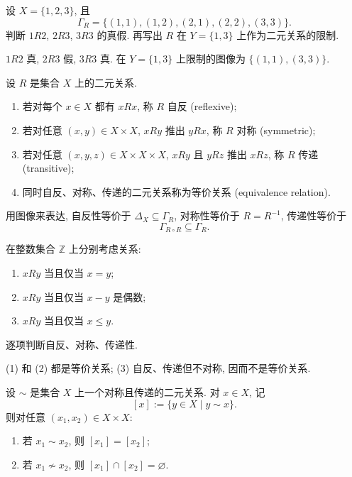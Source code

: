 \documentclass[usesamecnt, thmcnt=section, lang=cn, newtx, 10pt, scheme=chinese]{elegantbook}
\begin{document}
\begin{concept}\label{con:corr-14}
设 $X=\{1,2,3\}$, 且
\[
 \Gamma_R=\{(1,1),(1,2),(2,1),(2,2),(3,3)\}.
\]
判断 $1R2$, $2R3$, $3R3$ 的真假. 再写出 $R$ 在 $Y=\{1,3\}$ 上作为二元关系的限制.
\end{concept}

\begin{solution}
$1R2$ 真, $2R3$ 假, $3R3$ 真. 在 $Y=\{1,3\}$ 上限制的图像为 $\{(1,1),(3,3)\}$.
\end{solution}

\begin{definition}[等价关系]\label{def:corr-equivalence}
设 $R$ 是集合 $X$ 上的二元关系.
\begin{enumerate}[label=\rm(\arabic*)]
  \item 若对每个 $x\in X$ 都有 $xRx$, 称 $R$ {\color{blue}自反 (reflexive)};
  \item 若对任意 $(x,y)\in X\times X$, $xRy$ 推出 $yRx$, 称 $R$ {\color{blue}对称 (symmetric)};
  \item 若对任意 $(x,y,z)\in X\times X\times X$, $xRy$ 且 $yRz$ 推出 $xRz$, 称 $R$ {\color{blue}传递 (transitive)};
  \item 同时自反、对称、传递的二元关系称为{\color{blue}等价关系 (equivalence relation)}.
\end{enumerate}
用图像来表达, 自反性等价于 $\Delta_X\subseteq\Gamma_R$, 对称性等价于 $R=R^{-1}$, 传递性等价于
\[
 \Gamma_{R\circ R}\subseteq\Gamma_R.
\]
\end{definition}

\begin{concept}\label{con:corr-15}
在整数集合 $\mathbb Z$ 上分别考虑关系:
\begin{enumerate}[label=\rm(\arabic*)]
  \item $xRy$ 当且仅当 $x=y$;
  \item $xRy$ 当且仅当 $x-y$ 是偶数;
  \item $xRy$ 当且仅当 $x\leq y$.
\end{enumerate}
逐项判断自反、对称、传递性.
\end{concept}

\begin{solution}
(1) 和 (2) 都是等价关系; (3) 自反、传递但不对称, 因而不是等价关系.
\end{solution}

\begin{lemma}\label{lem:corr-equivalence-class}
设 $\sim$ 是集合 $X$ 上一个对称且传递的二元关系. 对 $x\in X$, 记
\[
 [x]:=\{y\in X\mid y\sim x\}.
\]
则对任意 $(x_1,x_2)\in X\times X$:
\begin{enumerate}[label=\rm(\arabic*)]
  \item 若 $x_1\sim x_2$, 则 $[x_1]=[x_2]$;
  \item 若 $x_1\not\sim x_2$, 则 $[x_1]\cap[x_2]=\varnothing$.
\end{enumerate}
\end{lemma}
\end{document}
